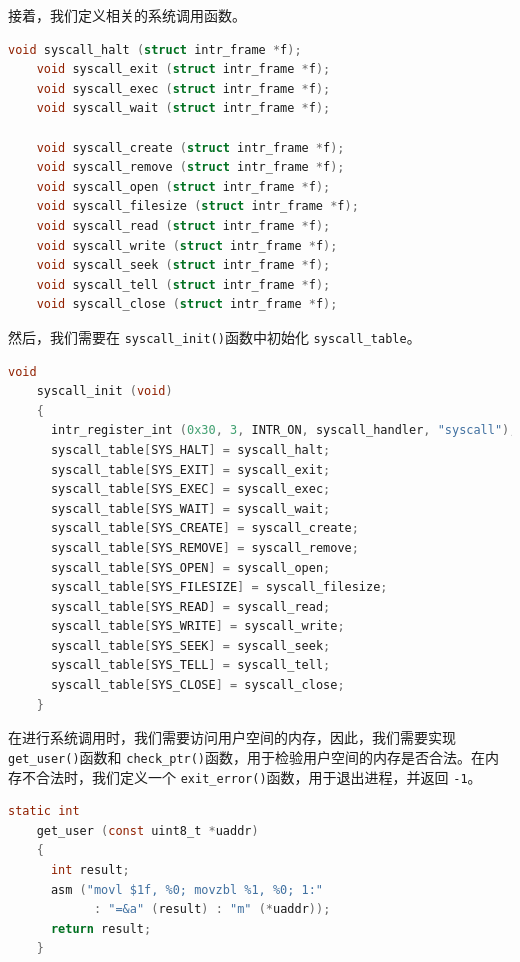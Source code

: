 \documentclass{article}
\begin{document}
接着，我们定义相关的系统调用函数。

\begin{lstlisting}[language=C, title=\texttt{src/userprog/syscall.h}]
    void syscall_halt (struct intr_frame *f);
    void syscall_exit (struct intr_frame *f);
    void syscall_exec (struct intr_frame *f);
    void syscall_wait (struct intr_frame *f);
    
    void syscall_create (struct intr_frame *f);
    void syscall_remove (struct intr_frame *f);
    void syscall_open (struct intr_frame *f);
    void syscall_filesize (struct intr_frame *f);
    void syscall_read (struct intr_frame *f);
    void syscall_write (struct intr_frame *f);
    void syscall_seek (struct intr_frame *f);
    void syscall_tell (struct intr_frame *f);
    void syscall_close (struct intr_frame *f);
\end{lstlisting}

然后，我们需要在 \texttt{syscall\_init()}函数中初始化 \texttt{syscall\_table}。

\begin{lstlisting}[language=C, title=\texttt{src/userprog/syscall.c - syscall\_init()}]
    void
    syscall_init (void) 
    {
      intr_register_int (0x30, 3, INTR_ON, syscall_handler, "syscall");
      syscall_table[SYS_HALT] = syscall_halt;
      syscall_table[SYS_EXIT] = syscall_exit;
      syscall_table[SYS_EXEC] = syscall_exec;
      syscall_table[SYS_WAIT] = syscall_wait;
      syscall_table[SYS_CREATE] = syscall_create;
      syscall_table[SYS_REMOVE] = syscall_remove;
      syscall_table[SYS_OPEN] = syscall_open;
      syscall_table[SYS_FILESIZE] = syscall_filesize;
      syscall_table[SYS_READ] = syscall_read;
      syscall_table[SYS_WRITE] = syscall_write;
      syscall_table[SYS_SEEK] = syscall_seek;
      syscall_table[SYS_TELL] = syscall_tell;
      syscall_table[SYS_CLOSE] = syscall_close;
    }
\end{lstlisting}

在进行系统调用时，我们需要访问用户空间的内存，因此，我们需要实现 \texttt{get\_user()}函数和 \texttt{check\_ptr()}函数，用于检验用户空间的内存是否合法。在内存不合法时，我们定义一个 \texttt{exit\_error()}函数，用于退出进程，并返回 \texttt{-1}。

\begin{lstlisting}[language=C, title=\texttt{src/userprog/syscall.c - get\_user()}]
    static int
    get_user (const uint8_t *uaddr)
    {
      int result;
      asm ("movl $1f, %0; movzbl %1, %0; 1:"
            : "=&a" (result) : "m" (*uaddr));
      return result;
    }
\end{lstlisting}
\end{document}
